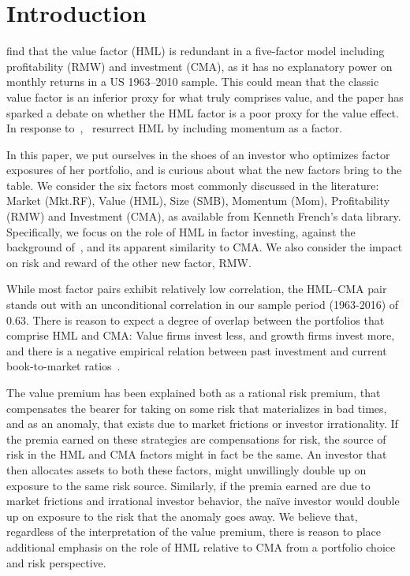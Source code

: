 \section{Introduction}
\textcite{FF2015} find that the value factor (HML) is redundant in a five-factor model including profitability (RMW) and investment (CMA), as it has no explanatory power on monthly returns in a US 1963–2010 sample. This could mean that the classic value factor is an inferior proxy for what truly comprises value, and the paper has sparked a debate on whether the HML factor is a poor proxy for the value effect. In response to~\textcite{FF2015},~\textcite{Asness2015} resurrect HML by including momentum as a factor.

In this paper, we put ourselves in the shoes of an investor who optimizes factor exposures of her portfolio, and is curious about what the new factors bring to the table. We consider the six factors most commonly discussed in the literature: Market (Mkt.RF), Value (HML), Size (SMB), Momentum (Mom), Profitability (RMW) and Investment (CMA), as available from Kenneth French's data library. Specifically, we focus on the role of HML in factor investing, against the background of~\textcite{FF2015,Asness2015}, and its apparent similarity to CMA. We also consider the impact on risk and reward of the other new factor, RMW.

While most factor pairs exhibit relatively low correlation, the HML--CMA pair stands out with an unconditional correlation in our sample period (1963-2016) of 0.63. There is reason to expect a degree of overlap between the portfolios that comprise HML and CMA: Value firms invest less, and growth firms invest more, and there is a negative empirical relation between past investment and current book-to-market ratios~\autocite{Zhang2005,AndersonGarciaFeijoo2006}.

The value premium has been explained both as a rational risk premium, that compensates the bearer for taking on some risk that materializes in bad times, and as an anomaly, that exists due to market frictions or investor irrationality. If the premia earned on these strategies are compensations for risk, the source of risk in the HML and CMA factors might in fact be the same. An investor that then allocates assets to both these factors, might unwillingly double up on exposure to the same risk source. Similarly, if the premia earned are due to market frictions and irrational investor behavior, the naïve investor would double up on exposure to the risk that the anomaly goes away. We believe that, regardless of the interpretation of the value premium, there is reason to place additional emphasis on the role of HML relative to CMA from a portfolio choice and risk perspective.

